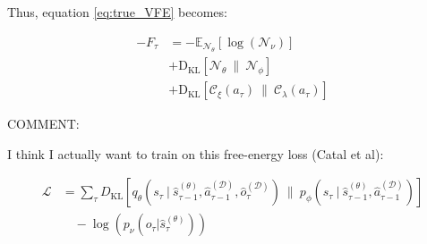 \documentclass{article}
\begin{document}
Thus, equation \ref{eq:true_VFE} becomes:

\begin{equation}
    \begin{aligned}
        \label{eq:approx_VFE}
        -F_{\tau} &= -\mathbb{E}_{\mathcal{N}_{\theta}}[\log{(\mathcal{N}_{\nu})}] \\
        &+ \text{D}_{\text{KL}}[\mathcal{N}_{\theta} \ \| \ \mathcal{N}_{\phi}] \\
        &+ \text{D}_{\text{KL}}[\mathcal{C}_{\xi}(a_{\tau}) \ \| \ \mathcal{C}_{\lambda}(a_{\tau})]
    \end{aligned}
\end{equation}

COMMENT:

I think I actually want to train on this free-energy loss (Catal et al):

\begin{equation}
    \begin{aligned}
        \label{eq:approx_VFE_Catal}
        \mathcal{L} &= \sum_{\tau} D_{\text{KL}}\left[q_{\theta}(s_{\tau} \ | \ \hat{s}_{\tau - 1}^{(\theta)}, \hat{a}_{\tau - 1}^{(\mathcal{D})}, \hat{o}_{\tau}^{(\mathcal{D})}) \ \| \ p_{\phi}(s_{\tau} \ | \ \hat{s}_{\tau - 1}^{(\theta)}, \hat{a}_{\tau - 1}^{(\mathcal{D})})\right] \\
        &\quad - \log\left(p_{\nu}(o_{\tau} | \hat{s}_{\tau}^{(\theta)})\right)
    \end{aligned}
\end{equation}


\end{document}
